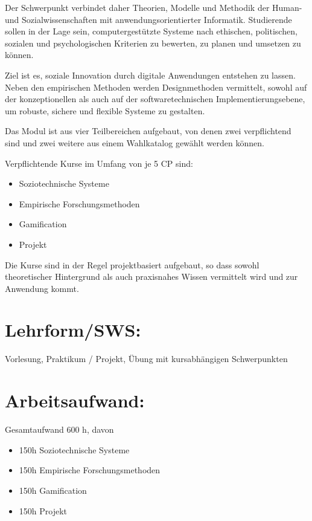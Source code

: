 Der Schwerpunkt verbindet daher Theorien, Modelle und Methodik der
Human- und Sozialwissenschaften mit anwendungsorientierter Informatik.
Studierende sollen in der Lage sein, computergestützte Systeme nach
ethischen, politischen, sozialen und psychologischen Kriterien zu
bewerten, zu planen und umsetzen zu können.

Ziel ist es, soziale Innovation durch digitale Anwendungen entstehen zu
lassen. Neben den empirischen Methoden werden Designmethoden vermittelt,
sowohl auf der konzeptionellen als auch auf der softwaretechnischen
Implementierungsebene, um robuste, sichere und flexible Systeme zu
gestalten.

Das Modul ist aus vier Teilbereichen aufgebaut, von denen zwei
verpflichtend sind und zwei weitere aus einem Wahlkatalog gewählt werden
können.

Verpflichtende Kurse im Umfang von je 5 CP sind:

\begin{itemize}
\tightlist
\item
  Soziotechnische Systeme
\item
  Empirische Forschungsmethoden
\item
  Gamification
\item
  Projekt
\end{itemize}

Die Kurse sind in der Regel projektbasiert aufgebaut, so dass sowohl
theoretischer Hintergrund als auch praxisnahes Wissen vermittelt wird
und zur Anwendung kommt.

\section*{Lehrform/SWS:}\label{lehrformsws-27}

Vorlesung, Praktikum / Projekt, Übung mit kursabhängigen Schwerpunkten

\section*{Arbeitsaufwand:}\label{arbeitsaufwand-26}

Gesamtaufwand 600 h, davon

\begin{itemize}
\tightlist
\item
  150h Soziotechnische Systeme
\item
  150h Empirische Forschungsmethoden
\item
  150h Gamification
\item
  150h Projekt
\end{itemize}

